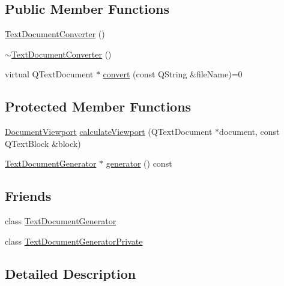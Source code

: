\subsection*{Public Member Functions}
\begin{DoxyCompactItemize}
\item 
\hyperlink{classOkular_1_1TextDocumentConverter_ac0425522408a3f84f25c2cc085fdac54}{Text\+Document\+Converter} ()
\item 
\hyperlink{classOkular_1_1TextDocumentConverter_a83c5a77eec81c9f6ede7484ea5753ce0}{$\sim$\+Text\+Document\+Converter} ()
\item 
virtual Q\+Text\+Document $\ast$ \hyperlink{classOkular_1_1TextDocumentConverter_ad05f8bcde0f347c6292968fab331bcef}{convert} (const Q\+String \&file\+Name)=0
\end{DoxyCompactItemize}
\subsection*{Protected Member Functions}
\begin{DoxyCompactItemize}
\item 
\hyperlink{classOkular_1_1DocumentViewport}{Document\+Viewport} \hyperlink{classOkular_1_1TextDocumentConverter_a5d8709540be1213da6dac78759ce7172}{calculate\+Viewport} (Q\+Text\+Document $\ast$document, const Q\+Text\+Block \&block)
\item 
\hyperlink{classOkular_1_1TextDocumentGenerator}{Text\+Document\+Generator} $\ast$ \hyperlink{classOkular_1_1TextDocumentConverter_aaa9e4688148d24be5ade2df14299c759}{generator} () const 
\end{DoxyCompactItemize}
\subsection*{Friends}
\begin{DoxyCompactItemize}
\item 
class \hyperlink{classOkular_1_1TextDocumentConverter_a0a259fd10df5d599787dfbe154563772}{Text\+Document\+Generator}
\item 
class \hyperlink{classOkular_1_1TextDocumentConverter_a5349ae9a7f4c1aaa74f2727fcbcc2ebf}{Text\+Document\+Generator\+Private}
\end{DoxyCompactItemize}


\subsection{Detailed Description}


